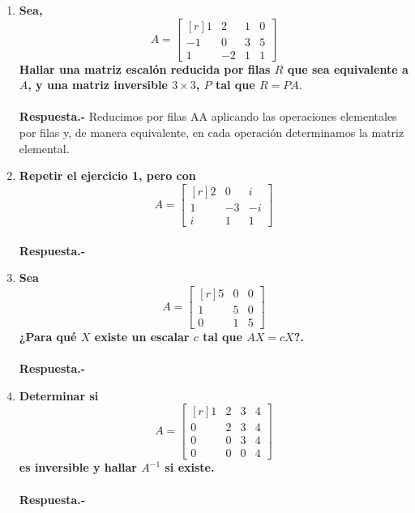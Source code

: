\begin{enumerate}
    \item \textbf{\boldmath Sea,
	$$A=\begin{bmatrix*}[r]
	    1 & 2 & 1 & 0\\
	    -1 & 0 & 3 & 5\\
	    1 & -2 & 1 & 1
    \end{bmatrix*}$$
    Hallar una matriz escalón reducida por filas $R$ que sea equivalente a $A$, y una matriz inversible $3\times 3$, $P$ tal que $R=PA.$\\\\
	Respuesta.-}\; Reducimos por filas AA aplicando las operaciones elementales por filas y, de manera equivalente, en cada operación determinamos la matriz elemental.

    \item \textbf{\boldmath Repetir el ejercicio 1, pero con 
	$$A=\begin{bmatrix*}[r]
	    2 & 0 & i\\
	    1 & -3 & -i\\
	    i & 1 & 1
	\end{bmatrix*}$$\\
	Respuesta.-}\;

    \item \textbf{\boldmath Sea 
	$$A=\begin{bmatrix*}[r]
	    5&0&0\\
	    1&5&0\\
	    0&1&5
	\end{bmatrix*}$$
	¿Para qué $X$ existe un escalar $c$ tal que $AX=cX$?.\\\\
	Respuesta.-}\;

    \item \textbf{\boldmath Determinar si
	$$A=\begin{bmatrix*}[r]
	    1&2&3&4\\
	    0&2&3&4\\
	    0&0&3&4\\
	    0&0&0&4
	\end{bmatrix*}$$
	es inversible y hallar $A^{-1}$ si existe.\\\\
	Respuesta.-}\;


\end{enumerate}
